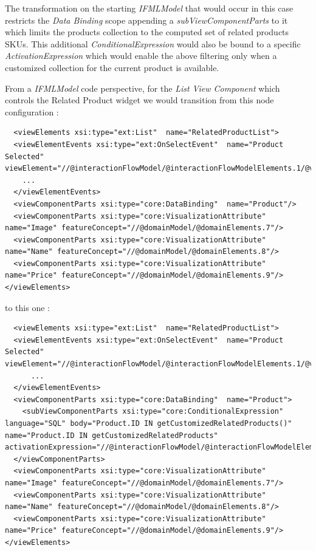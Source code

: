 The transformation on the starting \textit{IFMLModel} that would occur in this case restricts the \textit{Data Binding} scope appending a \textit{subViewComponentParts} to it which limits the products collection to the computed set of related products SKUs. This additional \textit{ConditionalExpression} would also be bound to a specific \textit{ActivationExpression} which would enable the above filtering only when a customized collection for the current product is available. 

From a \textit{IFMLModel} code perspective, for the \textit{List View Component} which controls the Related Product widget we would transition from this node configuration :

\vspace{0.5cm}
\lstset{language=XML}
\begin{lstlisting} 
  <viewElements xsi:type="ext:List"  name="RelatedProductList">
  <viewElementEvents xsi:type="ext:OnSelectEvent"  name="Product Selected" viewElement="//@interactionFlowModel/@interactionFlowModelElements.1/@viewElements.2">
    ...
  </viewElementEvents>
  <viewComponentParts xsi:type="core:DataBinding"  name="Product"/>
  <viewComponentParts xsi:type="core:VisualizationAttribute"  name="Image" featureConcept="//@domainModel/@domainElements.7"/>
  <viewComponentParts xsi:type="core:VisualizationAttribute"  name="Name" featureConcept="//@domainModel/@domainElements.8"/>
  <viewComponentParts xsi:type="core:VisualizationAttribute"  name="Price" featureConcept="//@domainModel/@domainElements.9"/>
</viewElements>
\end{lstlisting}
\vspace{0.5cm}

to this one :

\vspace{0.5cm}
\lstset{language=XML}
\begin{lstlisting} 
  <viewElements xsi:type="ext:List"  name="RelatedProductList">
  <viewElementEvents xsi:type="ext:OnSelectEvent"  name="Product Selected" viewElement="//@interactionFlowModel/@interactionFlowModelElements.1/@viewElements.2">
      ...
  </viewElementEvents>
  <viewComponentParts xsi:type="core:DataBinding"  name="Product">
    <subViewComponentParts xsi:type="core:ConditionalExpression"  language="SQL" body="Product.ID IN getCustomizedRelatedProducts()" name="Product.ID IN getCustomizedRelatedProducts" activationExpression="//@interactionFlowModel/@interactionFlowModelElements.17"/>
  </viewComponentParts>
  <viewComponentParts xsi:type="core:VisualizationAttribute"  name="Image" featureConcept="//@domainModel/@domainElements.7"/>
  <viewComponentParts xsi:type="core:VisualizationAttribute"  name="Name" featureConcept="//@domainModel/@domainElements.8"/>
  <viewComponentParts xsi:type="core:VisualizationAttribute"  name="Price" featureConcept="//@domainModel/@domainElements.9"/>
</viewElements>
\end{lstlisting}
\vspace{0.5cm}

